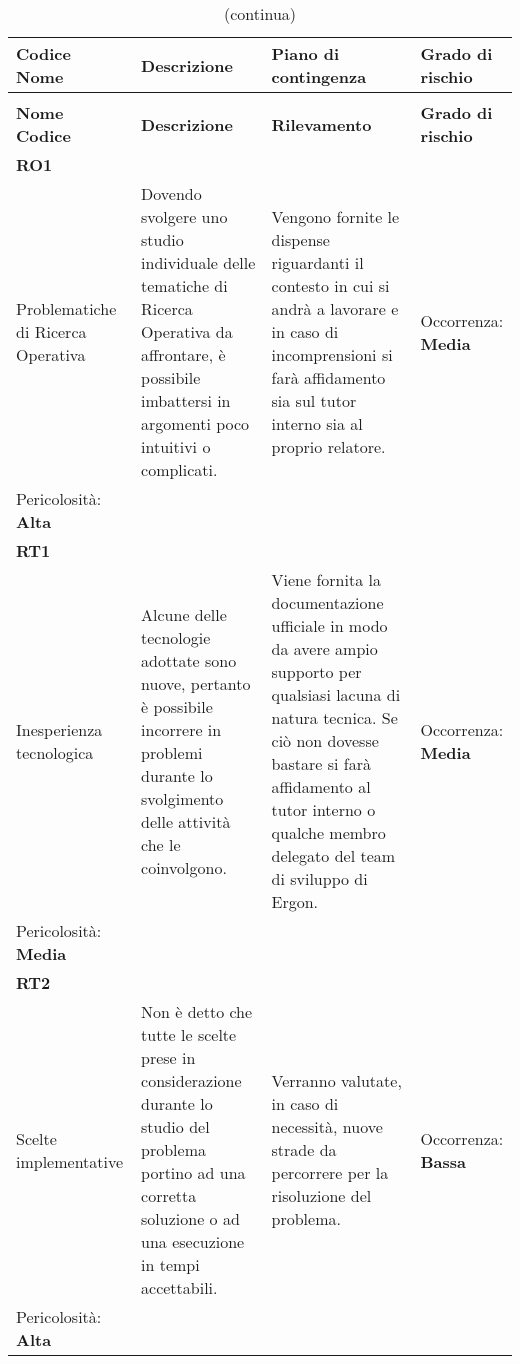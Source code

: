 \renewcommand{\arraystretch}{1.5}
\begin{longtable}{ 
		>{\centering}p{} 
		>{\raggedright}p{}
		>{\raggedright}p{} 
		>{\centering}p{}
	}
	
	\caption{Tabella dei rischi di progetto}
	\label{rischi}
	\\
	\rowcolorhead
	\textbf{Codice \\ Nome} & \centering{}\textbf{Descrizione} & 
	\centering{}\textbf{Piano di contingenza} & 
	\textbf{Grado di rischio} 
	\tabularnewline
	\endfirsthead
	\rowcolor{white}\caption[]{(continua)}\\
	\rowcolorhead
	\textbf{Nome \\ Codice} & \centering{}\textbf{Descrizione} & 
	\centering{}\textbf{Rilevamento} & 
	\textbf{Grado di rischio} 
	\tabularnewline
	\endhead
	
	\rowcolordark \textbf{RO1} \\ Problematiche di Ricerca Operativa & 
	Dovendo svolgere uno studio individuale delle tematiche di Ricerca Operativa da affrontare, è possibile imbattersi in argomenti poco intuitivi o complicati. &
	Vengono fornite le dispense riguardanti il contesto in cui si andrà a lavorare e in caso di incomprensioni si farà affidamento sia sul tutor interno sia al proprio relatore. &
	Occorrenza: \textbf{Media} \\
	Pericolosità: \textbf{Alta} 
	\tabularnewline
	
	\rowcolorlight \textbf{RT1} \\ Inesperienza tecnologica & 
	Alcune delle tecnologie adottate sono nuove, pertanto è possibile incorrere in problemi durante lo svolgimento delle attività che le coinvolgono. &
	Viene fornita la documentazione ufficiale in modo da avere ampio supporto per qualsiasi lacuna di natura tecnica. Se ciò non dovesse bastare si farà affidamento al tutor interno o qualche membro delegato del team di sviluppo di Ergon. &
	Occorrenza: \textbf{Media} \\
	Pericolosità: \textbf{Media} 
	\tabularnewline

	\rowcolordark \textbf{RT2} \\ Scelte implementative & 
	Non è detto che tutte le scelte prese in considerazione durante lo studio del problema portino ad una corretta soluzione o ad una esecuzione in tempi accettabili. &
	Verranno valutate, in caso di necessità, nuove strade da percorrere per la risoluzione del problema. &
	Occorrenza: \textbf{Bassa} \\
	Pericolosità: \textbf{Alta} 
	\tabularnewline
	
	
\end{longtable}
	
\renewcommand{\arraystretch}{1}